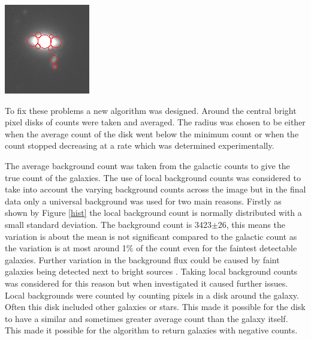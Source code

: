 \documentclass[10pt,a4paper]{article}
\begin{document}
\begin{center}
\includegraphics [width=10 cm]{algorithm2.png}
\label{algorithm2}
\end{center}


 To fix these problems a new algorithm was designed. Around the central bright pixel disks of counts were taken and averaged. The radius was chosen to be either when the average count of the disk went below the minimum count or when the count stopped decreasing at a rate which was determined experimentally.  

The average background count was taken from the galactic counts to give the true count of the galaxies. The use of local background counts was considered to take into account the varying background counts across the image but in the final data only a universal background was used for two main reasons. Firstly as shown by Figure \ref{hist} the local background count is normally distributed with a small standard deviation. The background count is 3423$\pm$26, this means the variation is about the mean is not significant compared to the galactic count as the variation is at most around 1\% of the count even for the faintest detectable galaxies. Further variation in the background flux could be caused by faint galaxies being detected next to bright sources . Taking local background counts was considered for this reason but when investigated it caused further issues. Local backgrounds were counted by counting pixels in a disk around the galaxy. Often this disk included other galaxies or stars. This made it possible for the disk to have a similar and sometimes greater average count than the galaxy itself. This made it possible for the algorithm to return galaxies with negative counts.
\end{document}

